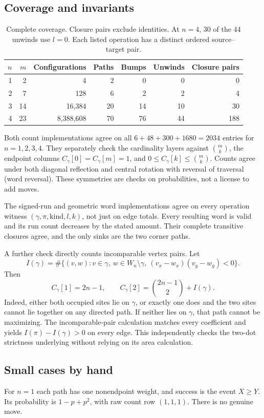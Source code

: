 \documentclass[11pt,a4paper]{article}
\begin{document}
\subsection{Coverage and invariants}
\begin{table}[ht]
\centering
\begin{tabular}{r r r r r r r}
\toprule
$n$&$m$&Configurations&Paths&Bumps&Unwinds&Closure pairs\\
\midrule
1&2&4&2&0&0&0\\
2&7&128&6&2&2&4\\
3&14&16,384&20&14&10&30\\
4&23&8,388,608&70&76&44&188\\
\bottomrule
\end{tabular}
\caption{Complete coverage. Closure pairs exclude identities. At $n=4$,
30 of the 44 unwinds use $l=0$. Each listed operation has a distinct
ordered source--target pair.}
\end{table}
Both count implementations agree on all $6+48+300+1680=2034$ entries
for $n=1,2,3,4$. They separately check the cardinality layers against
$\binom mk$, the endpoint columns $C_\gamma[0]=C_\gamma[m]=1$,
and $0\leq C_\gamma[k]\leq\binom mk$. Counts agree under both diagonal
reflection and central rotation with reversal of traversal (word reversal).
These symmetries are checks on probabilities, not a license to add moves.

The signed-run and geometric word implementations agree on every
operation witness $(\gamma,\pi,\mathrm{kind},l,k)$, not just on edge
totals. Every resulting word is valid and its run count decreases by
the stated amount. Their complete transitive closures agree, and the
only sinks are the two corner paths.

A further check directly counts incomparable vertex pairs. Let
\[
 I(\gamma)=
 \#\{(v,w):v\in\gamma,\ w\in W_n\setminus\gamma,\
                   (v_x-w_x)(v_y-w_y)<0\}.
\]
Then
\[
 C_\gamma[1]=2n-1,\qquad
 C_\gamma[2]=\binom{2n-1}{2}+I(\gamma).
\]
Indeed, either both occupied sites lie on $\gamma$, or exactly one
does and the two sites cannot lie together on any directed path.
If neither lies on $\gamma$, that path cannot be maximizing.
The incomparable-pair calculation matches every coefficient and yields
$I(\pi)-I(\gamma)>0$ on every edge. This independently checks the
two-dot strictness underlying \cite[Lemma~9]{MN} without relying on
its area calculation.

\subsection{Small cases by hand}
For $n=1$ each path has one nonendpoint weight, and success is the event
$X\geq Y$. Its probability is $1-p+p^2$, with raw count row $(1,1,1)$.
There is no genuine move.
\end{document}
